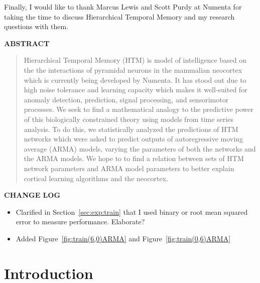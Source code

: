 \documentclass[oneside,12pt,openany]{book}
\begin{document}
	Finally, I would like to thank Marcus Lewis and Scott Purdy at Numenta for taking the time to discuss Hierarchical Temporal Memory and my research questions with them.
	\vfill
	\pagebreak
	
	\begin{center}
		\textbf{ABSTRACT}
		
		\begin{quotation}
			\noindent Hierarchical Temporal Memory (HTM) is model of intelligence based on the the interactions of pyramidal neurons in the mammalian neocortex which is currently being developed by Numenta. It has stood out due to high noise tolerance and learning capacity which makes it well-suited for anomaly detection, prediction, signal processing, and sensorimotor processes. We seek to find a mathematical analogy to the predictive power of this biologically constrained theory using models from time series analysis. To do this, we statistically analyzed the predictions of HTM networks which were asked to predict outputs of autoregressive moving average (ARMA) models, varying the parameters of both the networks and the ARMA models. We hope to to find a relation between sets of HTM network parameters and ARMA model parameters to better explain cortical learning algorithms and the neocortex.
		\end{quotation}

		
	\end{center}
	\vfill
	\pagebreak
	
	\textbf{CHANGE LOG}
	\begin{itemize}[noitemsep]
		\item Clarified in Section~\ref{sec:exp:train} that I used binary or root mean squared error to measure performance. Elaborate?
		\item Added Figure~\ref{fig:train(6,0)ARMA} and Figure~\ref{fig:train(0,6)ARMA}
	\end{itemize}
	\vfill
	\pagebreak
	\vfill
	\pagebreak
	\setcounter{tocdepth}{1}
	\listoffigures
	\vfill
	\pagebreak
	
	\listoftables
	\vfill

	\pagebreak
	
	\mainmatter
	\chapter{Introduction}
	
\end{document}
